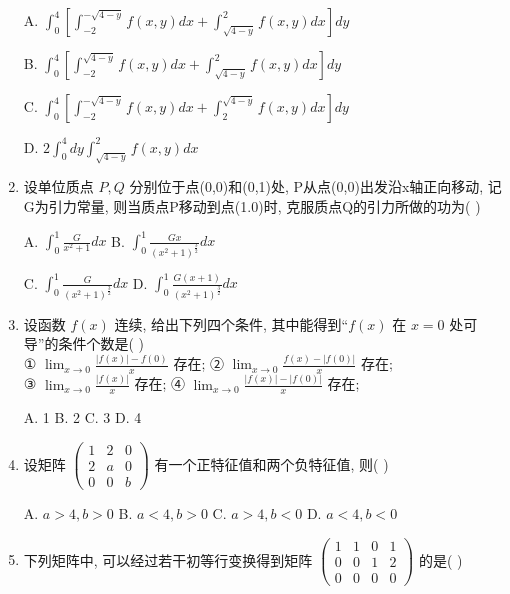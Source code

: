 \documentclass[UTF8]{ctexart}
\begin{document}
\begin{enumerate}
    A. $\int_{0}^{4}[\int_{-2}^{-\sqrt{4-y}}f(x,y)dx+\int_{\sqrt{4-y}}^{2}f(x,y)dx]dy$

    B. $\int_{0}^{4}[\int_{-2}^{\sqrt{4-y}}f(x,y)dx+\int_{\sqrt{4-y}}^{2}f(x,y)dx]dy$

    C. $\int_{0}^{4}[\int_{-2}^{-\sqrt{4-y}}f(x,y)dx+\int_{2}^{\sqrt{4-y}}f(x,y)dx]dy$

    D. $2\int_{0}^{4}dy\int_{\sqrt{4-y}}^{2}f(x,y)dx$

\item 设单位质点 $P,Q$ 分别位于点(0,0)和(0,1)处, P从点(0,0)出发沿x轴正向移动, 记G为引力常量, 则当质点P移动到点(1.0)时, 克服质点Q的引力所做的功为( \quad )

    A. $\int_{0}^{1}\frac{G}{x^{2}+1}dx$ \qquad B. $\int_{0}^{1}\frac{Gx}{(x^{2}+1)^{\frac{3}{2}}}dx$
    
    C. $\int_{0}^{1}\frac{G}{(x^{2}+1)^{\frac{3}{2}}}dx$ \qquad D. $\int_{0}^{1}\frac{G(x+1)}{(x^{2}+1)^{\frac{3}{2}}}dx$

\item 设函数 $f(x)$ 连续, 给出下列四个条件, 其中能得到“$f(x)$ 在 $x=0$ 处可导”的条件个数是( \quad ) \\
    ① $\lim_{x\rightarrow0}\frac{|f(x)|-f(0)}{x}$ 存在; \quad ② $\lim_{x\rightarrow0}\frac{f(x)-|f(0)|}{x}$ 存在; \\
    ③ $\lim_{x\rightarrow0}\frac{|f(x)|}{x}$ 存在; \quad ④ $\lim_{x\rightarrow0}\frac{|f(x)|-|f(0)|}{x}$ 存在;

    A. 1 \qquad B. 2 \qquad C. 3 \qquad D. 4

\item 设矩阵 $\begin{pmatrix}1&2&0\\ 2&a&0\\ 0&0&b\end{pmatrix}$ 有一个正特征值和两个负特征值, 则( \quad )

    A. $a>4,b>0$ \qquad B. $a<4,b>0$ \qquad C. $a>4,b<0$ \qquad D. $a<4,b<0$

\item 下列矩阵中, 可以经过若干初等行变换得到矩阵 $\begin{pmatrix}1&1&0&1\\ 0&0&1&2\\ 0&0&0&0\end{pmatrix}$ 的是( \quad )


\end{enumerate}
\end{document}
